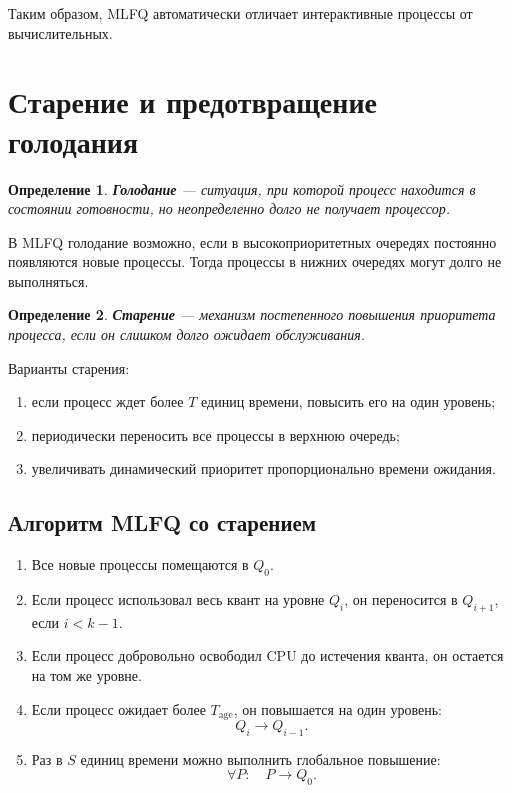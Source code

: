 \documentclass[12pt,a4paper]{article}
\newtheorem{definition}{Определение}
\begin{document}
Таким образом, MLFQ автоматически отличает интерактивные процессы от вычислительных.

\section{Старение и предотвращение голодания}

\begin{definition}
\textbf{Голодание} --- ситуация, при которой процесс находится в состоянии готовности, но неопределенно долго не получает процессор.
\end{definition}

В MLFQ голодание возможно, если в высокоприоритетных очередях постоянно появляются новые процессы. Тогда процессы в нижних очередях могут долго не выполняться.

\begin{definition}
\textbf{Старение} --- механизм постепенного повышения приоритета процесса, если он слишком долго ожидает обслуживания.
\end{definition}

Варианты старения:
\begin{enumerate}
    \item если процесс ждет более $T$ единиц времени, повысить его на один уровень;
    \item периодически переносить все процессы в верхнюю очередь;
    \item увеличивать динамический приоритет пропорционально времени ожидания.
\end{enumerate}

\subsection{Алгоритм MLFQ со старением}

\begin{enumerate}
    \item Все новые процессы помещаются в $Q_0$.
    \item Если процесс использовал весь квант на уровне $Q_i$, он переносится в $Q_{i+1}$, если $i < k-1$.
    \item Если процесс добровольно освободил CPU до истечения кванта, он остается на том же уровне.
    \item Если процесс ожидает более $T_{\text{age}}$, он повышается на один уровень:
    \[
    Q_i \rightarrow Q_{i-1}.
    \]
    \item Раз в $S$ единиц времени можно выполнить глобальное повышение:
    \[
    \forall P:\quad P \rightarrow Q_0.
    \]
\end{enumerate}
\end{document}
